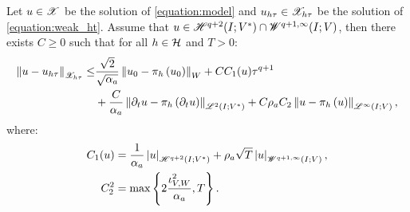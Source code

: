 \begin{theorem} \label{theorem:estimate_ht}
    Let $u \in \mathscr{X}$ be the solution of \cref{equation:model} and $u_{h \tau} \in \mathscr{X}_{h \tau}$ be the solution of \cref{equation:weak_ht}. Assume that $u \in \mathscr{H}^{q + 2}(I; V^*) \cap \mathscr{W}^{q + 1, \infty}(I; V)$, then there exists $C \geq 0$ such that for all $h \in \mathcal{H}$ and $T > 0$:
    \begin{align}
        \left\lVert u - u_{h \tau} \right\rVert_{\mathscr{X}_{h \tau}} \leq & \frac{\sqrt{2}}{\sqrt{\alpha_{a}}} \left\lVert u_0 - \pi_h \left( u_0 \right) \right\rVert_W + C C_1(u) \tau^{q + 1} \label{eq:estimates_ht} \\
        & + \frac{C}{\alpha_{a}} \left\lVert \partial_t u - \pi_h \left( \partial_t u \right) \right\rVert_{\mathscr{L}^{2}(I; V^*)} + C \rho_{a} C_2 \left\lVert u - \pi_h \left( u \right) \right\rVert_{\mathscr{L}^{\infty}(I; V)}, \notag
    \end{align}
    where:
    \begin{align}
        C_1(u) & = \frac{1}{\alpha_{a}} \left\lvert u \right\rvert_{\mathscr{H}^{q + 2}(I; V^*)} + \rho_{a} \sqrt{T} \left\lvert u \right\rvert_{\mathscr{W}^{q + 1, \infty}(I; V)}, \\
        C_2^2 & = \max \left\{ 2 \frac{\iota_{V, W}^2}{\alpha_{a}}, T \right\}.
    \end{align}
\end{theorem}

